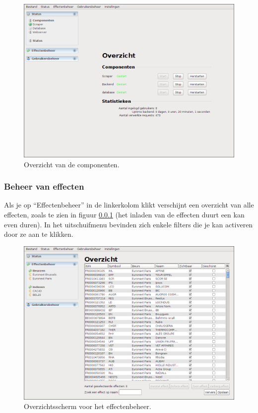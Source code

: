 \begin{figure}[h!]
	\centering
		\includegraphics[width=\textwidth]{images/handleiding/administratie/status-overzicht}
	\caption{Overzicht van de componenten.}
		\label{fig:handl:admin:status-overzicht}
\end{figure}

\subsubsection{Beheer van effecten}
\label{sec:handl:admin:effecten}

Als je op ``Effectenbeheer'' in de linkerkolom klikt verschijnt een overzicht van alle effecten, zoals te zien in figuur \ref{sec:handl:admin:effecten} (het inladen van de effecten duurt een kan even duren).
In het uitschuifmenu bevinden zich enkele filters die je kan activeren door ze aan te klikken.

\begin{figure}[h!]
	\centering
		\includegraphics[width=\textwidth]{images/handleiding/administratie/effecten-overzicht}
	\caption{Overzichtsscherm voor het effectenbeheer.}
		\label{fig:handl:admin:effecten-overzicht}
\end{figure}

